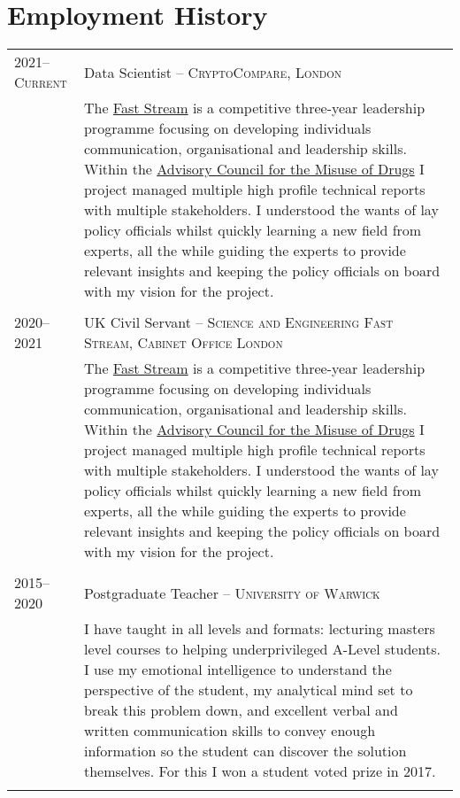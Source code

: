\documentclass[a4paper,10pt]{article}
\begin{document}
\section{Employment History}
\begin{tabular}{p{2.25cm}|p{15cm}}
	\textsc{2021--Current} & Data Scientist -- \textsc{CryptoCompare, London}\\&\footnotesize{The \href{https://www.faststream.gov.uk/}{Fast Stream} is a competitive three-year leadership programme focusing on developing individuals communication, organisational and leadership skills. Within the \href{https://www.gov.uk/government/organisations/advisory-council-on-the-misuse-of-drugs}{Advisory Council for the Misuse of Drugs} I project managed multiple high profile technical reports with multiple stakeholders. I understood the wants of lay policy officials whilst quickly learning a new field from experts, all the while guiding the experts to provide relevant insights and keeping the policy officials on board with my vision for the project.}\\\multicolumn{2}{c}{} \\
	\textsc{2020--2021} & UK Civil Servant -- \textsc{Science and Engineering Fast Stream, Cabinet Office London}\\&\footnotesize{The \href{https://www.faststream.gov.uk/}{Fast Stream} is a competitive three-year leadership programme focusing on developing individuals communication, organisational and leadership skills. Within the \href{https://www.gov.uk/government/organisations/advisory-council-on-the-misuse-of-drugs}{Advisory Council for the Misuse of Drugs} I project managed multiple high profile technical reports with multiple stakeholders. I understood the wants of lay policy officials whilst quickly learning a new field from experts, all the while guiding the experts to provide relevant insights and keeping the policy officials on board with my vision for the project.}\\\multicolumn{2}{c}{} \\
	\textsc{2015--2020} & Postgraduate Teacher -- \textsc{University of Warwick}\\&\footnotesize{I have taught in all levels and formats: lecturing masters level courses to helping underprivileged A-Level students. I use my emotional intelligence to understand the perspective of the student, my analytical mind set to break this problem down, and excellent verbal and written communication skills to convey enough information so the student can discover the solution themselves. For this I won a student voted prize in 2017.}\\\multicolumn{2}{c}{}
\end{tabular}
\vspace{-0.8cm}
\end{document}
